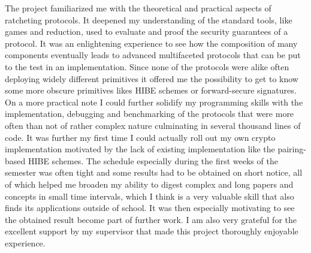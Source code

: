 \documentclass[11pt,a4paper,twoside,openright,bibliography=totoc]{scrbook}
\begin{document}
The project familiarized me with the theoretical and practical aspects
of ratcheting protocols.  It deepened my understanding of the standard
tools, like games and reduction, used to evaluate and proof the
security guarantees of a protocol. It was an enlightening experience
to see how the composition of many components eventually leads to
advanced multifaceted protocols that can be put to the test in an
implementation. Since none of the protocols were alike often deploying
widely different primitives it offered me the possibility to get to
know some more obscure primitives likes HIBE schemes or forward-secure
signatures. On a more practical note I could further solidify my
programming skills with the implementation, debugging and benchmarking
of the protocols that were more often than not of rather complex
nature culminating in several thousand lines of code. It was further
my first time I could actually roll out my own crypto implementation
motivated by the lack of existing implementation like the
pairing-based HIBE schemes. The schedule especially during the first
weeks of the semester was often tight and some results had to be
obtained on short notice, all of which helped me broaden my ability to
digest complex and long papers and concepts in small time intervals, which
I think is a very valuable skill that also finds its applications outside of
school. It was then especially motivating to see the obtained result
become part of further work. I am also very grateful for the excellent
support by my supervisor that made this project thoroughly enjoyable
experience.




\listoffigures
\end{document}
